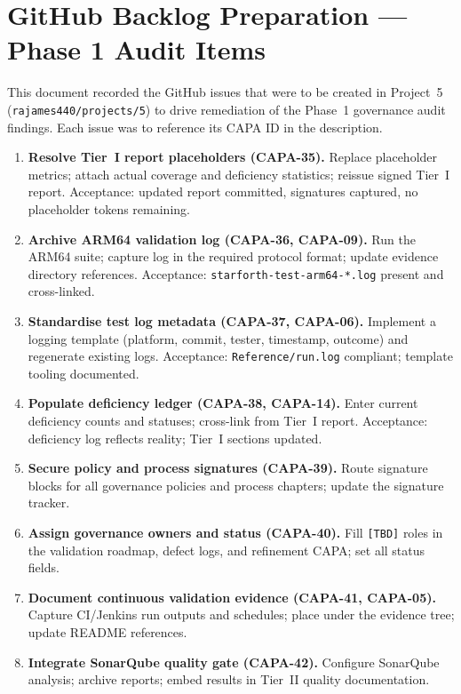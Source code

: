 
\section{GitHub Backlog Preparation --- Phase 1 Audit Items}

This document recorded the GitHub issues that were to be created in Project~5
(\texttt{rajames440/projects/5}) to drive remediation of the Phase~1 governance audit
findings. Each issue was to reference its CAPA ID in the description.

\begin{enumerate}
  \item \textbf{Resolve Tier~I report placeholders (CAPA-35).} Replace placeholder
        metrics; attach actual coverage and deficiency statistics; reissue signed
        Tier~I report. Acceptance: updated report committed, signatures captured,
        no placeholder tokens remaining.
  \item \textbf{Archive ARM64 validation log (CAPA-36, CAPA-09).} Run the ARM64
        suite; capture log in the required protocol format; update evidence directory
        references. Acceptance: \texttt{starforth-test-arm64-*.log} present and
        cross-linked.
  \item \textbf{Standardise test log metadata (CAPA-37, CAPA-06).} Implement a logging
        template (platform, commit, tester, timestamp, outcome) and regenerate existing
        logs. Acceptance: \texttt{Reference/run.log} compliant; template tooling
        documented.
  \item \textbf{Populate deficiency ledger (CAPA-38, CAPA-14).} Enter current deficiency
        counts and statuses; cross-link from Tier~I report. Acceptance: deficiency log
        reflects reality; Tier~I sections updated.
  \item \textbf{Secure policy and process signatures (CAPA-39).} Route signature blocks
        for all governance policies and process chapters; update the signature tracker.
  \item \textbf{Assign governance owners and status (CAPA-40).} Fill \texttt{[TBD]}
        roles in the validation roadmap, defect logs, and refinement CAPA; set all
        status fields.
  \item \textbf{Document continuous validation evidence (CAPA-41, CAPA-05).} Capture
        CI/Jenkins run outputs and schedules; place under the evidence tree; update
        README references.
  \item \textbf{Integrate SonarQube quality gate (CAPA-42).} Configure SonarQube
        analysis; archive reports; embed results in Tier~II quality documentation.
\end{enumerate}

